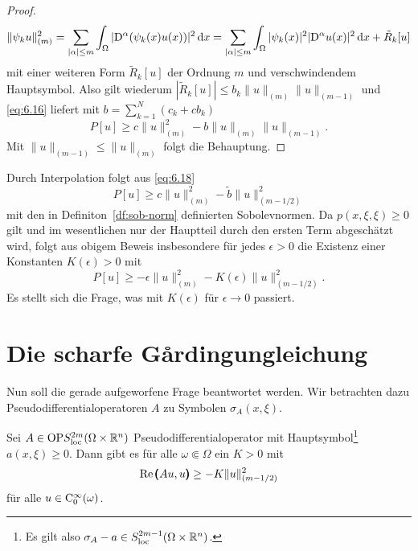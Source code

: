 \begin{proof}
\begin{equation}
   \|\psi_k u\|_{(m)}^2 =  \sum_{|\alpha|\le m} \int_\Omega |\mathrm D^\alpha (\psi_k(x) u(x)) |^2 \,\mathrm d x
   =   \sum_{|\alpha|\le m} \int_\Omega  |\psi_k(x)|^2  |\mathrm D^\alpha u(x) |^2 \,\mathrm d x + \tilde R_k[u]
\end{equation}
mit einer weiteren Form $\tilde R_k[u]$  der Ordnung $m$ und verschwindendem Hauptsymbol. Also gilt wiederum $|\tilde R_k[u]|\le b_k \|u\|_{(m)}\|u\|_{(m-1)}$ und  \eqref{eq:6.16} liefert mit $b= \sum_{k=1}^N (c_k + c b_k  )$
\begin{equation}\label{eq:6.18}
P[u] \ge c \|u\|_{(m)}^2 - b \|u\|_{(m)}\|u\|_{(m-1)} .
\end{equation}
Mit $\|u\|_{(m-1)}\le \|u\|_{(m)}$ folgt die Behauptung.
\end{proof}

\begin{rem} 
Durch Interpolation folgt aus \eqref{eq:6.18}
\begin{equation}
P[u] \ge c \|u\|_{(m)}^2 - \tilde b \|u\|_{(m-1/2)}^2
\end{equation}
mit den in Definiton~\ref{df:sob-norm} definierten Sobolevnormen. 
Da $p(x,\xi,\xi)\ge0$ gilt und im wesentlichen nur der Hauptteil durch den ersten Term abgeschätzt wird, folgt aus obigem Beweis insbesondere für jedes $\epsilon>0$
die Existenz einer Konstanten $K(\epsilon)>0$ mit
\begin{equation}
P[u] \ge -\epsilon \|u\|_{(m)}^2 - K(\epsilon) \|u\|_{(m-1/2)}^2.
\end{equation}
Es stellt sich die Frage, was mit $K(\epsilon)$ für $\epsilon\to0$ passiert. 
\end{rem}

\section{Die scharfe G\r{a}rdingungleichung}

Nun soll die gerade aufgeworfene Frage beantwortet werden. Wir betrachten dazu Pseudodifferentialoperatoren $A$ zu Symbolen $\sigma_A(x,\xi)$.

\begin{thm}
Sei $A\in {\rm OP}S^{2m}_{\rm loc}(\Omega\times\mathbb R^n)$ Pseudodifferentialoperator mit Hauptsymbol\footnote{Es gilt also $\sigma_A-a\in S^{2m-1}_{\rm loc}(\Omega\times\mathbb R^n)$.} $a(x,\xi)\ge0$. Dann gibt es  für alle $\omega\Subset \Omega$ ein $K>0$ mit
 \begin{equation}
    \operatorname{Re} \pmb(Au,u\pmb) \ge - K \|u\|_{(m-1/2)}^2 
 \end{equation}
 für alle $u\in\mathrm C_0^\infty(\omega)$.
\end{thm}

